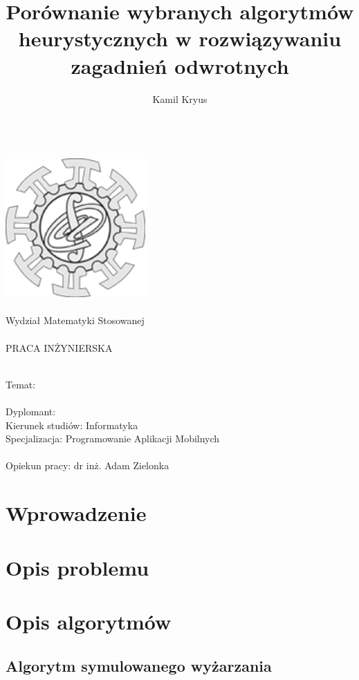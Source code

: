 \documentclass{report}
\title{Porównanie wybranych algorytmów heurystycznych w rozwiązywaniu zagadnień odwrotnych}
\author{Kamil Kryus}
\newcommand{\newLine}{~\\}
\begin{document}
	\begin{titlepage}
	\thispagestyle{fancy}
		\begin{center}
			\newLine
			\includegraphics[width=0.4\textwidth]{logo}\\ \newLine
			\huge{Wydział Matematyki Stosowanej} \\ \newLine

			PRACA INŻYNIERSKA \\ \newLine
		\end{center}
			\LARGE{Temat: \@title} \\ \newLine
			Dyplomant: \@author \\
			Kierunek studiów: Informatyka \\
			Specjalizacja: Programowanie Aplikacji Mobilnych \\ \newLine
			Opiekun pracy: dr inż. Adam Zielonka \\
	\end{titlepage}
	\newpage
	\tableofcontents
	\newpage
	\chapter{Wprowadzenie}
	
	\chapter{Opis problemu}

	\chapter{Opis algorytmów}
		\section{Algorytm symulowanego wyżarzania}
\end{document}
